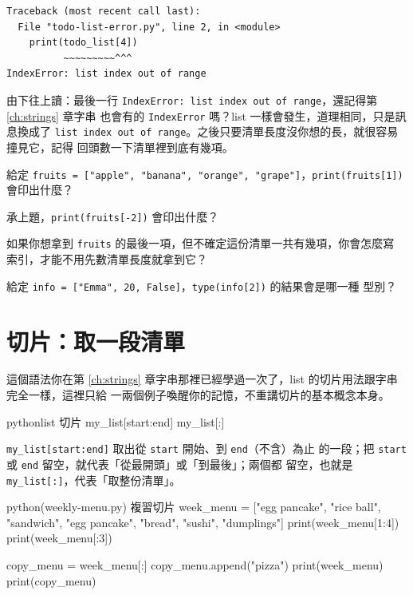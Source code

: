 \begin{verbatim}
Traceback (most recent call last):
  File "todo-list-error.py", line 2, in <module>
    print(todo_list[4])
          ~~~~~~~~~^^^
IndexError: list index out of range
\end{verbatim}

由下往上讀：最後一行 \texttt{IndexError: list index out of range}，還記得第 \ref{ch:strings} 章字串
也會有的 \texttt{IndexError} 嗎？list 一樣會發生，道理相同，只是訊息換成了
\texttt{list index out of range}。之後只要清單長度沒你想的長，就很容易撞見它，記得
回頭數一下清單裡到底有幾項。

\begin{drills}[label=drills:list-indexing]
\item 給定 \texttt{fruits = ["apple", "banana", "orange", "grape"]}，\texttt{print(fruits[1])}
會印出什麼？
\item 承上題，\texttt{print(fruits[-2])} 會印出什麼？
\item 如果你想拿到 \texttt{fruits} 的最後一項，但不確定這份清單一共有幾項，你會怎麼寫
索引，才能不用先數清單長度就拿到它？
\item 給定 \texttt{info = ["Emma", 20, False]}，\texttt{type(info[2])} 的結果會是哪一種
型別？
\end{drills}

\section{切片：取一段清單}
\label{sec:list-slicing}

這個語法你在第 \ref{ch:strings} 章字串那裡已經學過一次了，list 的切片用法跟字串完全一樣，這裡只給
一兩個例子喚醒你的記憶，不重講切片的基本概念本身。

\begin{code}{python}{list 切片}
my_list[start:end]
my_list[:]
\end{code}

\texttt{my\_list[start:end]} 取出從 \texttt{start} 開始、到 \texttt{end}（不含）為止
的一段；把 \texttt{start} 或 \texttt{end} 留空，就代表「從最開頭」或「到最後」；兩個都
留空，也就是 \texttt{my\_list[:]}，代表「取整份清單」。

\begin{example}{python}{(weekly-menu.py) 複習切片}
week_menu = ["egg pancake", "rice ball", "sandwich", "egg pancake", "bread", "sushi", "dumplings"]
print(week_menu[1:4])
print(week_menu[:3])

copy_menu = week_menu[:]
copy_menu.append("pizza")
print(week_menu)
print(copy_menu)
\end{example}

